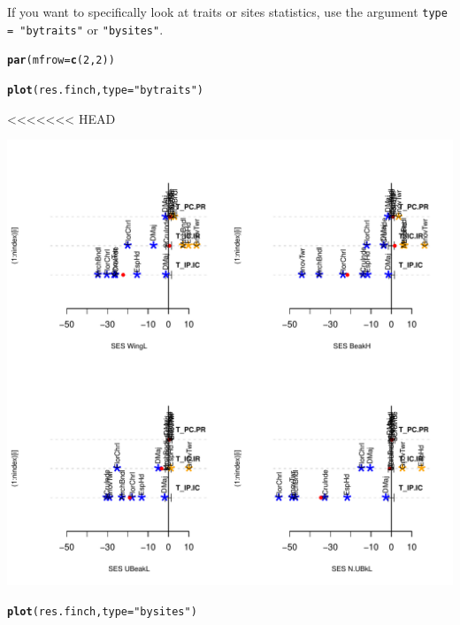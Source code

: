 \documentclass[12pt]{article}\usepackage[]{graphicx}\usepackage[]{color}
\makeatletter
\def\maxwidth{ %
  \ifdim\Gin@nat@width>\linewidth
    \linewidth
  \else
    \Gin@nat@width
  \fi
}
\newcommand{\hlnum}[1]{\textcolor[rgb]{0.686,0.059,0.569}{#1}}%
\newcommand{\hlstr}[1]{\textcolor[rgb]{0.192,0.494,0.8}{#1}}%
\newcommand{\hlstd}[1]{\textcolor[rgb]{0.345,0.345,0.345}{#1}}%
\newcommand{\hlkwc}[1]{\textcolor[rgb]{0.333,0.667,0.333}{#1}}%
\newcommand{\hlkwd}[1]{\textcolor[rgb]{0.737,0.353,0.396}{\textbf{#1}}}%
\newenvironment{kframe}{%
 \def\at@end@of@kframe{}%
 \ifinner\ifhmode%
  \def\at@end@of@kframe{\end{minipage}}%
  \begin{minipage}{\columnwidth}%
 \fi\fi%
 \def\FrameCommand##1{\hskip\@totalleftmargin \hskip-\fboxsep
 \colorbox{shadecolor}{##1}\hskip-\fboxsep
     \hskip-\linewidth \hskip-\@totalleftmargin \hskip\columnwidth}%
 \MakeFramed {\advance\hsize-\width
   \@totalleftmargin\z@ \linewidth\hsize
   \@setminipage}}%
 {\par\unskip\endMakeFramed%
 \at@end@of@kframe}
\newenvironment{knitrout}{}{} %
\makeatother
\begin{document}
If you want to specifically look at traits or sites statistics, use the argument \texttt{type = "bytraits"} or \texttt{"bysites"}.
\begin{knitrout}
\color{fgcolor}\begin{kframe}
\begin{alltt}
\hlkwd{par}\hlstd{(}\hlkwc{mfrow}\hlstd{=}\hlkwd{c}\hlstd{(}\hlnum{2}\hlstd{,}\hlnum{2}\hlstd{))}

\hlkwd{plot}\hlstd{(res.finch,} \hlkwc{type} \hlstd{=} \hlstr{"bytraits"}\hlstd{)}
\end{alltt}
<<<<<<< HEAD
\end{kframe}

{\centering \includegraphics[width=\maxwidth]{figure/unnamed-chunk-361} 

}


\begin{kframe}\begin{alltt}
\hlkwd{plot}\hlstd{(res.finch,} \hlkwc{type} \hlstd{=} \hlstr{"bysites"}\hlstd{)}
\end{alltt}
\end{kframe}


\end{knitrout}
\end{document}
